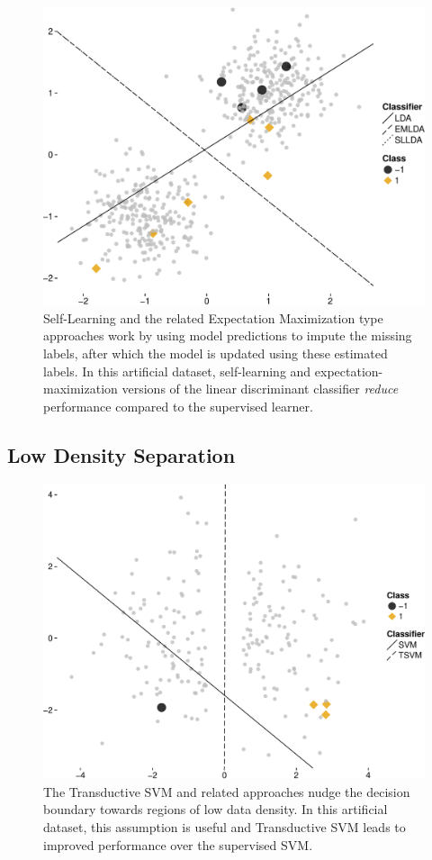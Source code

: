 \documentclass[final]{beamer}
\begin{document}
\begin{frame}[t]
\begin{multicols}{3}
\begin{figure}
\centering
\includegraphics[width=0.99\columnwidth]{Figure1.pdf}
\caption{Self-Learning and the related Expectation Maximization type approaches work by using model predictions to impute the missing labels, after which the model is updated using these estimated labels. In this artificial dataset, self-learning and expectation-maximization versions of the linear discriminant classifier \emph{reduce} performance compared to the supervised learner.}
\end{figure}

\subsection{Low Density Separation}
\begin{figure}
\centering
\includegraphics[width=0.99\columnwidth]{Figure2.pdf}
\caption{The Transductive SVM and related approaches nudge the decision boundary towards regions of low data density. In this artificial dataset, this assumption is useful and Transductive SVM leads to improved performance over the supervised SVM.}
\end{figure}
\vfill
\columnbreak


\end{multicols}
\end{frame}
\end{document}
